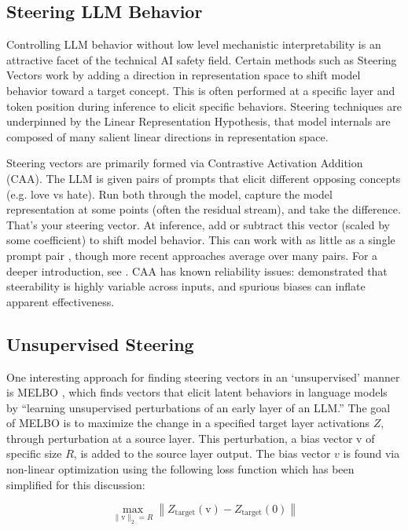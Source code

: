 \documentclass{article}
\begin{document}
\subsection{Steering LLM Behavior}

Controlling LLM behavior without low level mechanistic interpretability is an attractive facet of the technical AI safety field. Certain methods such as Steering Vectors work by adding a direction in representation space to shift model behavior toward a target concept. This is often performed at a specific layer and token position during inference to elicit specific behaviors. Steering techniques are underpinned by the Linear Representation Hypothesis, that model internals are composed of many salient linear directions in representation space.

Steering vectors are primarily formed via Contrastive Activation Addition (CAA). The LLM is given pairs of prompts that elicit different opposing concepts (e.g. love vs hate). Run both through the model, capture the model representation at some points (often the residual stream), and take the difference. That's your steering vector. At inference, add or subtract this vector (scaled by some coefficient) to shift model behavior. This can work with as little as a single prompt pair \citep{turner2023activation}, though more recent approaches average over many pairs. For a deeper introduction, see \citet{rimsky2023steering}. CAA has known reliability issues: \citet{tan2024analyzing} demonstrated that steerability is highly variable across inputs, and spurious biases can inflate apparent effectiveness.

\subsection{Unsupervised Steering}

One interesting approach for finding steering vectors in an `unsupervised' manner is MELBO \citep{mack2024mechanistically}, which finds vectors that elicit latent behaviors in language models by ``learning unsupervised perturbations of an early layer of an LLM.'' The goal of MELBO is to maximize the change in a specified target layer activations $Z$, through perturbation at a source layer. This perturbation, a bias vector $\text{v}$ of specific size $R$, is added to the source layer output. The bias vector $v$ is found via non-linear optimization using the following loss function which has been simplified for this discussion:

\begin{equation}
\max_{\|\text{v}\|_2 = R} \left\| Z_{\text{target}}(\text{v}) - Z_{\text{target}}(0) \right\|
\end{equation}
\end{document}
